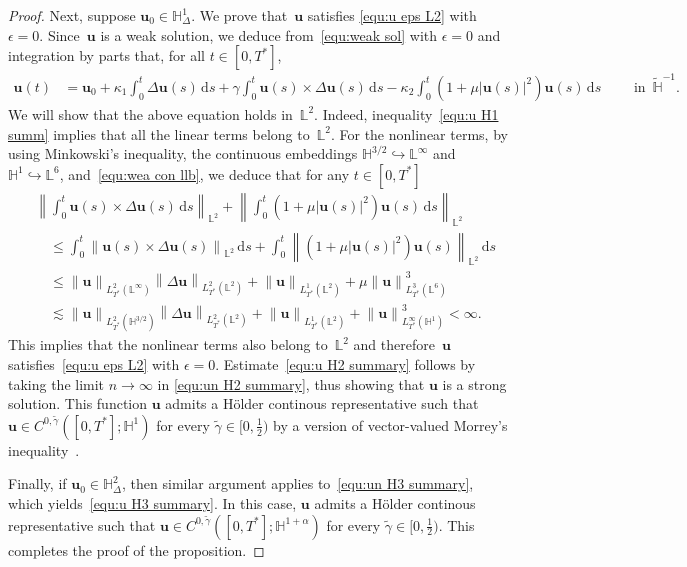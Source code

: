 \documentclass[11pt,reqno]{amsart}
\theoremstyle{definition}
\numberwithin{equation}{section}
\newcommand{\bff}{\boldsymbol}
\newcommand{\bb}{\mathbb}
\newcommand{\ds}{\mathrm{d}s}
\newcommand{\norm}[2]{\left\|{#1}\right\|_{#2}}
\begin{document}
\begin{proof}
	Next, suppose $\bff{u}_0\in \bb{H}^1_\Delta$. We prove that~$\bff{u}$ satisfies \eqref{equ:u eps L2} with $\epsilon=0$.
	Since~$\bff{u}$ is a weak solution, we deduce from~\eqref{equ:weak sol} with $\epsilon=0$
	and integration by parts that, for all $t\in [0,T^\ast]$,
	\begin{align*}
		\bff{u}(t)
		&= 
		\bff{u}_0
		+
		\kappa_1\int_0^t\Delta\bff{u}(s) \,\ds
		+
		\gamma\int_0^t\bff{u}(s)\times  \Delta\bff{u}(s) \,\ds
		-\kappa_2\int_0^t(1+\mu|\bff{u}(s)|^2)\bff{u}(s) \,\ds
		\qquad\text{ in }\,\widetilde{\bb{H}}^{-1}.
	\end{align*}
	We will show that the above equation holds in~$\bb{L}^2$.
	Indeed, inequality~\eqref{equ:u H1 summ} implies that all the linear terms belong
	to~$\bb{L}^2$. For the nonlinear terms, by using Minkowski's inequality, the
	continuous embeddings $\bb{H}^{3/2}\hookrightarrow \bb{L}^\infty$ and
	$\bb{H}^1\hookrightarrow \bb{L}^6$, and~\eqref{equ:wea con llb}, we deduce that
	for any $t\in [0,T^\ast]$
	\begin{align*}
		&\norm{\int_0^t\bff{u}(s)\times \Delta\bff{u}(s) \,\ds}{\bb{L}^2}
		+
		\norm{\int_0^t(1+\mu|\bff{u}(s)|^2)\bff{u}(s)\, \ds}{\bb{L}^2} 
		\\
		&\quad \leq 
		\int_0^t \norm{\bff{u}(s)\times  \Delta\bff{u}(s)}{\bb{L}^2} \,\ds
		+
		\int_0^t \norm{(1+\mu|\bff{u}(s)|^2)\bff{u}(s)}{\bb{L}^2} \,\ds\\
		&\quad \leq 
		\norm{\bff{u}}{L^2_{T^\ast}(\bb{L}^\infty)} \norm{\Delta \bff{u}}{L^2_{T^\ast}(\bb{L}^2)}
		+
		\norm{\bff{u}}{L^1_{T^\ast}(\bb{L}^2)} + \mu \norm{\bff{u}}{L^3_{T^\ast}(\bb{L}^6)}^3
		\\
		&\quad \lesssim
		\norm{\bff{u}}{L^2_{T^\ast}(\bb{H}^{3/2})} \norm{\Delta \bff{u}}{L^2_{T^\ast}(\bb{L}^2)} 
		+
		\norm{\bff{u}}{L^1_{T^\ast}(\bb{L}^2)} 
		+
		\norm{\bff{u}}{L^\infty_{T^\ast}(\bb{H}^1)}^3
		< \infty.
	\end{align*}
	This implies that the nonlinear terms also belong to~$\bb{L}^2$ and
	therefore~$\bff{u}$ satisfies~\eqref{equ:u eps L2} with $\epsilon=0$. Estimate~\eqref{equ:u H2 summary} follows by taking the limit $n\to\infty$ in \eqref{equ:un H2 summary}, thus showing that $\bff{u}$ is a strong solution. This function $\bff{u}$ admits a H\"older continous representative such that $\bff{u}\in C^{0,\widetilde{\gamma}}([0,T^\ast];\bb{H}^1)$ for every $\widetilde{\gamma}\in [0,\frac12)$ by a version of vector-valued Morrey's inequality~\citep{AreKre18}. 
	
	Finally, if $\bff{u}_0\in \bb{H}^2_\Delta$, then similar argument applies to~\eqref{equ:un H3 summary}, which yields~\eqref{equ:u H3 summary}. In this case, $\bff{u}$ admits a H\"older continous representative such that $\bff{u}\in C^{0,\widetilde{\gamma}}([0,T^\ast];\bb{H}^{1+\alpha})$ for every $\widetilde{\gamma}\in [0,\frac12)$.
	This completes the proof of the proposition.
\end{proof}
\end{document}
